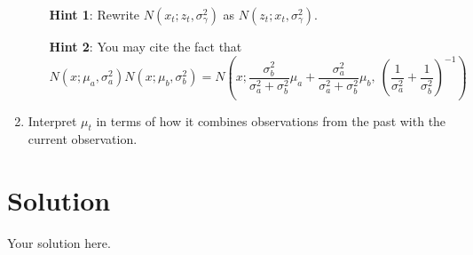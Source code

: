 \documentclass[submit]{harvardml}
\newcommand{\siggam}{\sigma_{\gamma}}
\newenvironment{solution}
  {\color{blue}\section*{Solution}}
{}
\begin{document}
\begin{problem}
\begin{enumerate}
\begin{enumerate}
      \textbf{Hint 1}: Rewrite $N(x_t; z_t, \siggam^2)$ as $N(z_t; x_t, \siggam^2)$.
      
      \textbf{Hint 2}: You may cite the fact that 
      \[N(x; \mu_a, \sigma^2_a)N(x; \mu_b, \sigma^2_b) = N\left(x; \frac{\sigma^2_b}{\sigma^2_a+\sigma^2_b}\mu_a + \frac{\sigma^2_a}{\sigma^2_a+\sigma^2_b}\mu_b, \ \left(\frac{1}{\sigma^2_a} + \frac{1}{\sigma^2_b}\right)^{-1}\right)\]
  \end{enumerate}
  \item Interpret $\mu_t$ in terms of how it combines observations from the past with the current observation. 
\end{enumerate}
\end{problem}


\begin{solution}
	Your solution here.
\end{solution}

\newpage
\end{document}
